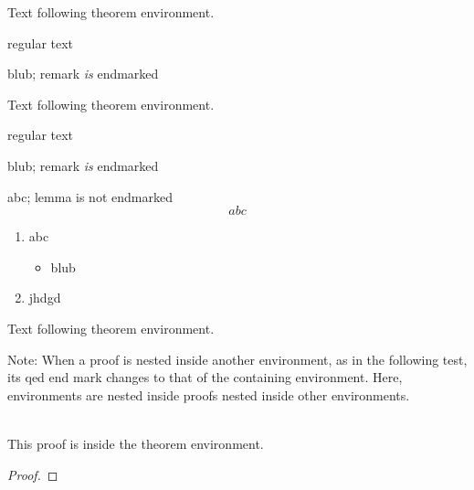 Text following theorem environment.

\begin{theorem}
  regular text
  \begin{remark}
    blub; remark \emph{is} endmarked
  \end{remark}
\end{theorem}

Text following theorem environment.

\begin{theorem}
  regular text
  \begin{remark}
    blub; remark \emph{is} endmarked
  \end{remark}
  \begin{lemma}
    abc; lemma is not endmarked
    \begin{equation*}
      abc
    \end{equation*}
    \begin{enumerate}
    \item abc
      \begin{itemize}
      \item blub
      \end{itemize}
    \item jhdgd
    \end{enumerate}
  \end{lemma}
\end{theorem}


Text following theorem environment.


Note: When a proof is nested inside another environment, as in the following test, its qed end mark changes to that of the containing environment.
Here, environments are nested inside proofs nested inside other environments.

\begin{theorem}
  \\
  This proof is inside the theorem environment.
  \begin{proof}
  \end{proof}
\end{theorem}



